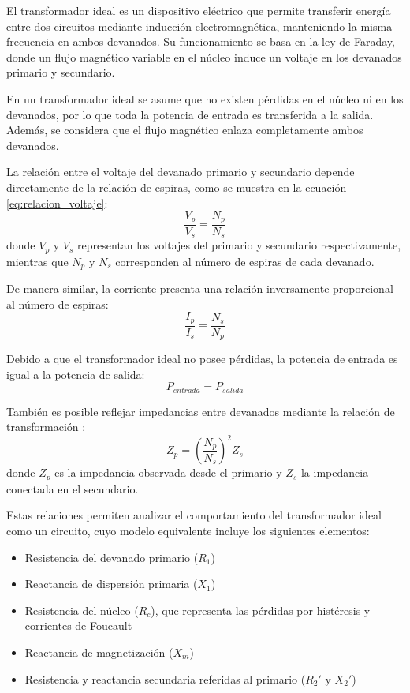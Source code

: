 \documentclass[conference]{IEEEtran}
\begin{document}
El transformador ideal es un dispositivo eléctrico que permite transferir energía entre dos circuitos mediante inducción electromagnética, manteniendo la misma frecuencia en ambos devanados. Su funcionamiento se basa en la ley de Faraday, donde un flujo magnético variable en el núcleo induce un voltaje en los devanados primario y secundario.

En un transformador ideal se asume que no existen pérdidas en el núcleo ni en los devanados, por lo que toda la potencia de entrada es transferida a la salida. Además, se considera que el flujo magnético enlaza completamente ambos devanados.

La relación entre el voltaje del devanado primario y secundario depende directamente de la relación de espiras, como se muestra en la ecuación \eqref{eq:relacion_voltaje}:
\begin{equation}
\frac{V_p}{V_s} = \frac{N_p}{N_s}
\label{eq:relacion_voltaje}
\end{equation}
donde $V_p$ y $V_s$ representan los voltajes del primario y secundario respectivamente, mientras que $N_p$ y $N_s$ corresponden al número de espiras de cada devanado.

De manera similar, la corriente presenta una relación inversamente proporcional al número de espiras:
\begin{equation}
\frac{I_p}{I_s} = \frac{N_s}{N_p}
\label{eq:relacion_corriente}
\end{equation}

Debido a que el transformador ideal no posee pérdidas, la potencia de entrada es igual a la potencia de salida:
\begin{equation}
P_{entrada} = P_{salida}
\label{eq:potencia_ideal}
\end{equation}

También es posible reflejar impedancias entre devanados mediante la relación de transformación \cite{chapman}:
\begin{equation}
Z_p = \left(\frac{N_p}{N_s}\right)^2 Z_s
\label{eq:impedancia_reflejada}
\end{equation}
donde $Z_p$ es la impedancia observada desde el primario y $Z_s$ la impedancia conectada en el secundario.

Estas relaciones permiten analizar el comportamiento del transformador ideal como un circuito, cuyo modelo equivalente incluye los siguientes elementos:

\begin{itemize}
    \item Resistencia del devanado primario ($R_1$)
    \item Reactancia de dispersión primaria ($X_1$)
    \item Resistencia del núcleo ($R_c$), que representa las pérdidas por histéresis y corrientes de Foucault
    \item Reactancia de magnetización ($X_m$)
    \item Resistencia y reactancia secundaria referidas al primario ($R_2'$ y $X_2'$)
\end{itemize}
\end{document}
